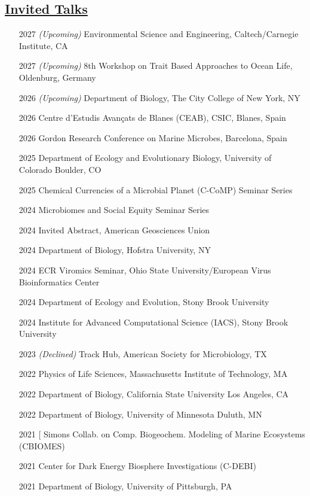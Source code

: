 \documentclass[]{res}
\begin{document}
\begin{resume}
   \section{\underline{Invited Talks}} 
    \begin{enumerate}
\item[2027 \emph{(Upcoming)}]  Environmental Science and Engineering, Caltech/Carnegie Institute, CA
\item[2027 \emph{(Upcoming)}]  8th Workshop on Trait Based Approaches to Ocean Life, Oldenburg, Germany
\item[2026 \emph{(Upcoming)}] Department of Biology, The City College of New York, NY
\item[2026] Centre d'Estudis Avan\c{c}ats de Blanes (CEAB), CSIC, Blanes, Spain
\item[2026] Gordon Research Conference on Marine Microbes, Barcelona, Spain
\item[2025] Department of Ecology and Evolutionary Biology, University of Colorado Boulder, CO
\item[2025] Chemical Currencies of a Microbial Planet (C-CoMP) Seminar Series
\item[2024] Microbiomes and Social Equity Seminar Series
\item[2024] Invited Abstract, American Geosciences Union
\item[2024] Department of Biology, Hofstra University, NY
\item[2024] ECR Viromics Seminar, Ohio State University/European Virus Bioinformatics Center
\item[2024] Department of Ecology and Evolution, Stony Brook University
\item[2024] Institute for Advanced Computational Science (IACS), Stony Brook University
\item[2023 \emph{(Declined)}] Track Hub, American Society for Microbiology, TX
\item[2022] Physics of Life Sciences, Massachusetts Institute of Technology, MA
\item[2022] Department of Biology, California State University Los Angeles, CA
\item[2022] Department of Biology, University of Minnesota Duluth, MN
\item[2021][ Simons Collab. on Comp. Biogeochem. Modeling of Marine Ecosystems (CBIOMES)
\item[2021] Center for Dark Energy Biosphere Investigations (C-DEBI)
\item[2021] Department of Biology, University of Pittsburgh, PA

\end{enumerate}
\end{resume}
\end{document}
